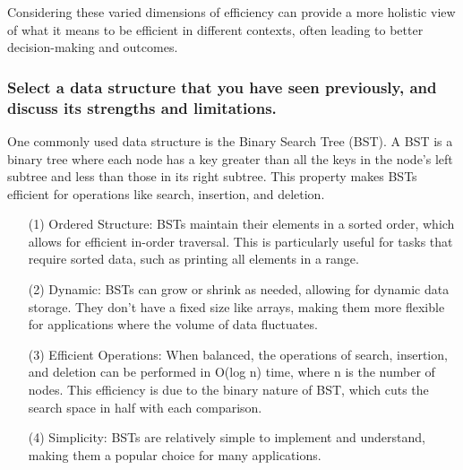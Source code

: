 Considering these varied dimensions of efficiency can provide a more holistic view of what it means to be efficient in different contexts, often leading to better decision-making and outcomes.

\subsubsection{Select a data structure that you have seen previously, and discuss its strengths and limitations.}

One commonly used data structure is the Binary Search Tree (BST). A BST is a binary tree where each node has a key greater than all the keys in the node's left subtree and less than those in its right subtree. This property makes BSTs efficient for operations like search, insertion, and deletion.


\begin{enumerate}[leftmargin=2em]

\item[(1)] Ordered Structure: BSTs maintain their elements in a sorted order, which allows for efficient in-order traversal. This is particularly useful for tasks that require sorted data, such as printing all elements in a range.

\item[(2)] Dynamic: BSTs can grow or shrink as needed, allowing for dynamic data storage. They don't have a fixed size like arrays, making them more flexible for applications where the volume of data fluctuates.

\item[(3)] Efficient Operations: When balanced, the operations of search, insertion, and deletion can be performed in O(log n) time, where n is the number of nodes. This efficiency is due to the binary nature of BST, which cuts the search space in half with each comparison.

\item[(4)] Simplicity: BSTs are relatively simple to implement and understand, making them a popular choice for many applications.
\end{enumerate}


